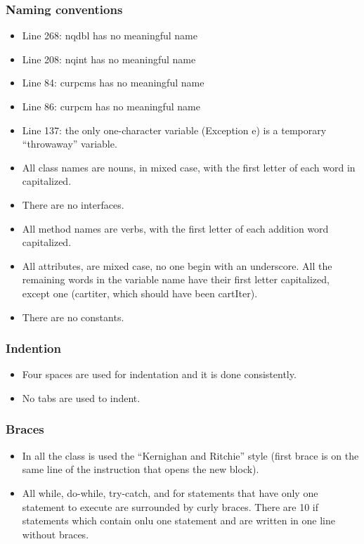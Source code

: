 \subsubsection{Naming conventions}
\begin{itemize}

\item Line 268: nqdbl has no meaningful name
\item Line 208: nqint has no meaningful name
\item Line 84: curpcms has no meaningful name
\item Line 86: curpcm has no meaningful name

\item Line 137: the only one-character variable (Exception e) is a temporary
“throwaway” variable.

\item All class names are nouns, in mixed case, with the first letter of each word
in capitalized.

\item There are no interfaces.

\item All method names are verbs, with the first letter of each addition
word capitalized.

\item All attributes, are mixed case, no one begin
with an underscore. All the
remaining words in the variable name have their first letter capitalized, except one (cartiter, which should have been cartIter).
 
 
 \item There are no constants.
\end{itemize}

\subsubsection{Indention}
\begin{itemize}
\item Four spaces are used for indentation and it is done consistently. 
\item No tabs are used to indent.
\end{itemize}


\subsubsection{Braces}
\begin{itemize}
\item In all the class is used the “Kernighan and
Ritchie” style (first brace is on the same line of the instruction that
opens the new block).

\item All while, do-while, try-catch, and for statements that have
only one statement to execute are surrounded by curly braces. There are 10 if statements which contain onlu one statement and are written in one line without braces.

\end{itemize}

